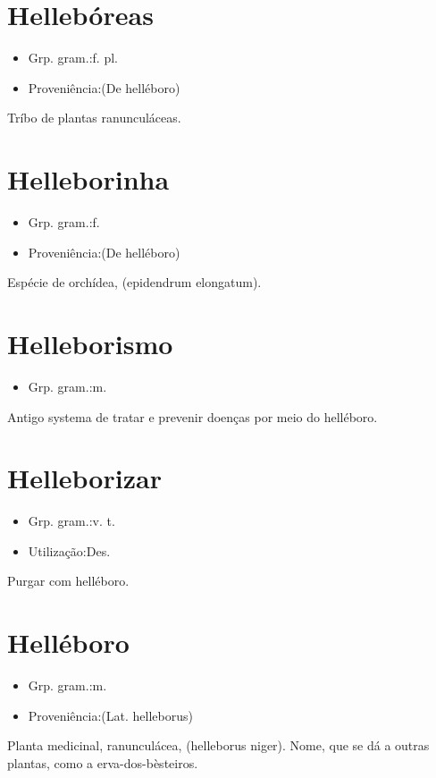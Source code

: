 \documentclass{article}
\begin{document}
\section{Hellebóreas}
\begin{itemize}
\item {Grp. gram.:f. pl.}
\end{itemize}
\begin{itemize}
\item {Proveniência:(De \textunderscore helléboro\textunderscore )}
\end{itemize}
Tríbo de plantas ranunculáceas.
\section{Helleborinha}
\begin{itemize}
\item {Grp. gram.:f.}
\end{itemize}
\begin{itemize}
\item {Proveniência:(De \textunderscore helléboro\textunderscore )}
\end{itemize}
Espécie de orchídea, (\textunderscore epidendrum elongatum\textunderscore ).
\section{Helleborismo}
\begin{itemize}
\item {Grp. gram.:m.}
\end{itemize}
Antigo systema de tratar e prevenir doenças por meio do helléboro.
\section{Helleborizar}
\begin{itemize}
\item {Grp. gram.:v. t.}
\end{itemize}
\begin{itemize}
\item {Utilização:Des.}
\end{itemize}
Purgar com helléboro.
\section{Helléboro}
\begin{itemize}
\item {Grp. gram.:m.}
\end{itemize}
\begin{itemize}
\item {Proveniência:(Lat. \textunderscore helleborus\textunderscore )}
\end{itemize}
Planta medicinal, ranunculácea, (\textunderscore helleborus niger\textunderscore ).
Nome, que se dá a outras plantas, como a \textunderscore erva-dos-bèsteiros\textunderscore .
\end{document}
